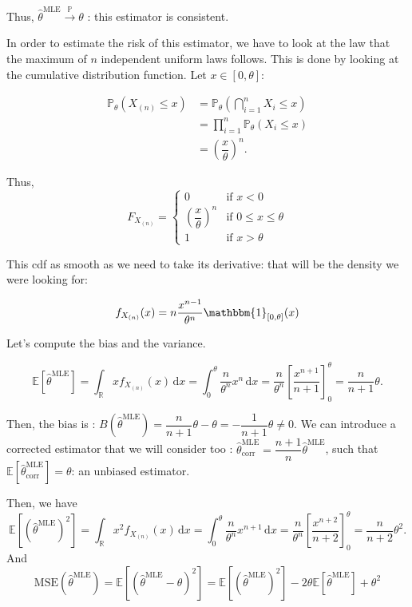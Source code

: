 Thus, $\hat{\theta}^{\text{MLE}} \xrightarrow{\mathbb{P}} \theta$ : this estimator is consistent.\newline

In order to estimate the risk of this estimator, we have to look at the law that the maximum of $n$ independent uniform laws follows. This is done by looking at the cumulative distribution function. Let $x \in [0,\theta] :$

\begin{align*}
    \mathbb{P}_\theta(X_{(n)} \le x) &= \mathbb{P}_\theta\left(\bigcap_{i=1}^{n} {X_i \le x}\right)\\
    &= \prod_{i=1}^{n} \mathbb{P}_\theta(X_i \le x)\\
    &= \left(\dfrac{x}{\theta}\right)^n.
\end{align*}

Thus, $$F_{X_{(n)}} = \begin{cases}
        0 & \text{if } x < 0\\
        \left(\dfrac{x}{\theta}\right)^n & \text{if } 0 \le x \le \theta\\
        1 & \text{if } x>\theta
        \end{cases}$$

This cdf as smooth as we need to take its derivative: that will be the density we were looking for:

$$f_{X_{(n)}}(x) = n \dfrac{x^{n-1}}{\theta^n} \mathbbm{1}_{[0, \theta]}(x)$$

Let's compute the bias and the variance.\newline

$$\mathbb{E}[\hat{\theta}^{\text{MLE}}] = \displaystyle \int_{\mathbb{R}} x f_{X_{(n)}}(x) \, \mathrm{d}x = \displaystyle \int_{0}^{\theta} \dfrac{n}{\theta^n} x^n \, \mathrm{d}x = \dfrac{n}{\theta^n} \left[ \dfrac{x^{n+1}}{n+1}\right]^\theta_0 = \dfrac{n}{n+1}\theta.$$

Then, the bias is : $B(\hat{\theta}^{\text{MLE}}) = \dfrac{n}{n+1}\theta - \theta = -\dfrac{1}{n+1}\theta \ne 0.$ We can introduce a corrected estimator that we will consider too : $\hat{\theta}_{\text{corr}}^{\text{MLE}} = \dfrac{n+1}{n} \hat{\theta}^{\text{MLE}}$, such that $\mathbb{E}[\hat{\theta}_{\text{corr}}^{\text{MLE}}] = \theta$:  an unbiased estimator.\newline

Then, we have $$\mathbb{E}[(\hat{\theta}^{\text{MLE}})^2] = \displaystyle \int_{\mathbb{R}} x^2 f_{X_{(n)}}(x) \, \mathrm{d}x = \displaystyle \int_{0}^{\theta} \dfrac{n}{\theta^n} x^{n+1} \, \mathrm{d}x = \dfrac{n}{\theta^n} \left[ \dfrac{x^{n+2}}{n+2}\right]^\theta_0 = \dfrac{n}{n+2}\theta^2.$$ And $$\text{MSE}(\hat{\theta}^{\text{MLE}}) = \mathbb{E}[(\hat{\theta}^{\text{MLE}} - \theta)^2] = \mathbb{E}[(\hat{\theta}^{\text{MLE}})^2] -2 \theta \mathbb{E}[\hat{\theta}^{\text{MLE}}] + \theta^2$$

